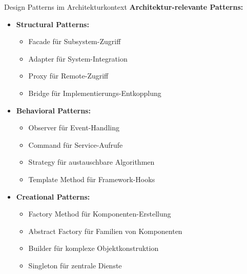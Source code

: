 \begin{concept}{Design Patterns im Architekturkontext}
    \small
\textbf{Architektur-relevante Patterns:}
\begin{itemize}
    \item \textbf{Structural Patterns:}
    \begin{itemize}
        \item Facade für Subsystem-Zugriff
        \item Adapter für System-Integration
        \item Proxy für Remote-Zugriff
        \item Bridge für Implementierungs-Entkopplung
    \end{itemize}
    
    \item \textbf{Behavioral Patterns:}
    \begin{itemize}
        \item Observer für Event-Handling
        \item Command für Service-Aufrufe
        \item Strategy für austauschbare Algorithmen
        \item Template Method für Framework-Hooks
    \end{itemize}
    
    \item \textbf{Creational Patterns:}
    \begin{itemize}
        \item Factory Method für Komponenten-Erstellung
        \item Abstract Factory für Familien von Komponenten
        \item Builder für komplexe Objektkonstruktion
        \item Singleton für zentrale Dienste
    \end{itemize}
\end{itemize}
\end{concept}

